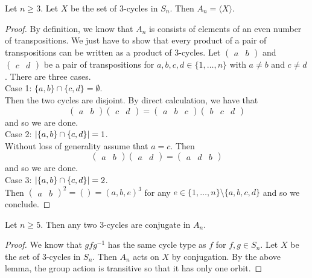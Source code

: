 \documentclass[a4paper]{article}
\begin{document}
\begin{lmm}{}{} Let $n\geq 3$. Let $X$ be the set of $3$-cycles in $S_n$. Then $A_n=\langle X\rangle$. 
\begin{proof}
By definition, we know that $A_n$ is consists of elements of an even number of transpositions. We just have to show that every product of a pair of transpositions can be written as a product of $3$-cycles. Let $\begin{pmatrix}a&b\end{pmatrix}$ and $\begin{pmatrix}c&d\end{pmatrix}$ be a pair of transpositions for $a,b,c,d\in\{1,\dots,n\}$ with $a\neq b$ and $c\neq d$. There are three cases. \\

Case 1: $\{a,b\}\cap\{c,d\}=\emptyset$. \\
Then the two cycles are disjoint. By direct calculation, we have that $$\begin{pmatrix}a&b\end{pmatrix}\begin{pmatrix}c&d\end{pmatrix}=\begin{pmatrix}a&b&c\end{pmatrix}\begin{pmatrix}b&c&d\end{pmatrix}$$ and so we are done. \\

Case 2: $\abs{\{a,b\}\cap\{c,d\}}=1$. \\
Without loss of generality assume that $a=c$. Then $$\begin{pmatrix}a&b\end{pmatrix}\begin{pmatrix}a&d\end{pmatrix}=\begin{pmatrix}a&d&b\end{pmatrix}$$ and so we are done. \\

Case 3: $\abs{\{a,b\}\cap\{c,d\}}=2$. \\
Then $\begin{pmatrix}a&b\end{pmatrix}^2=()=(a,b,e)^3$ for any $e\in\{1,\dots,n\}\setminus\{a,b,c,d\}$ and so we conclude. 
\end{proof}
\end{lmm}

\begin{lmm}{}{} Let $n\geq 5$. Then any two $3$-cycles are conjugate in $A_n$. 
\begin{proof}
We know that $gfg^{-1}$ has the same cycle type as $f$ for $f,g\in S_n$. Let $X$ be the set of $3$-cycles in $S_n$. Then $A_n$ acts on $X$ by conjugation. By the above lemma, the group action is transitive so that it has only one orbit. 
\end{proof}
\end{lmm}
\end{document}
